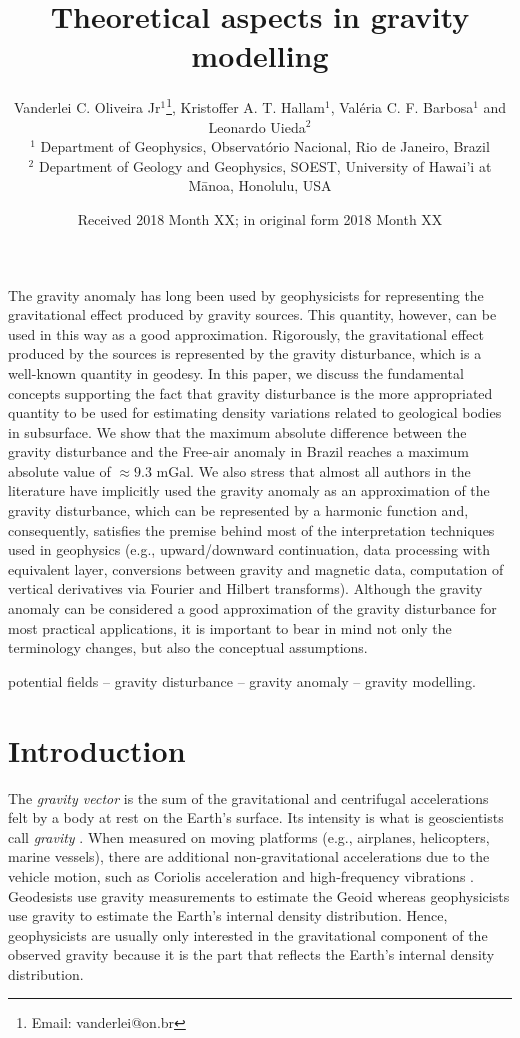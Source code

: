 \documentclass[extra]{gji}
\title[Theoretical aspects in gravity modelling]
      {Theoretical aspects in gravity modelling}
\author[Oliveira Jr et al.]
{Vanderlei C. Oliveira Jr$^1$\thanks{Email: vanderlei@on.br},
Kristoffer A. T. Hallam$^{1}$, Val\'{e}ria C. F. Barbosa$^1$
and Leonardo Uieda$^2$ \\
$^1$ Department of Geophysics, Observat\'{o}rio Nacional, Rio de Janeiro, Brazil \\
$^2$ Department of Geology and Geophysics, SOEST, University of Hawai'i at M\={a}noa, Honolulu, USA
}
\date{Received 2018 Month XX; in original form 2018 Month XX}
\begin{document}
\label{firstpage}

\maketitle


\begin{summary}
 The gravity anomaly has long been used by geophysicists for
 representing the gravitational effect produced by gravity
 sources. This quantity, however, can be used in this way as a good
 approximation. Rigorously, the gravitational effect produced by the sources
 is represented by the gravity disturbance, which is a well-known
 quantity in geodesy.
 In this paper, we discuss the fundamental concepts supporting
 the fact that gravity disturbance is the more appropriated quantity
 to be used for estimating density variations related to geological
 bodies in subsurface. We show that the maximum absolute difference
 between the gravity disturbance and the Free-air anomaly in Brazil
 reaches a maximum absolute value of $\approx 9.3$ mGal. We also stress
 that almost all authors in the literature have implicitly used the
 gravity anomaly as an approximation of the gravity disturbance,
 which can be represented by a harmonic function and, consequently,
 satisfies the premise behind most of
 the interpretation techniques used in geophysics (e.g.,
 upward/downward continuation, data processing with equivalent layer,
 conversions between gravity and magnetic data, computation of vertical
 derivatives via Fourier and Hilbert transforms).
 Although the gravity anomaly can be considered a good approximation of the
 gravity disturbance for most practical applications,
 it is important to bear in mind not only the terminology
 changes, but also the conceptual assumptions.

\end{summary}

\begin{keywords}
 potential fields -- gravity disturbance -- gravity anomaly -- gravity modelling.
\end{keywords}


\section{Introduction}

The \textit{gravity vector} is the sum of the gravitational and centrifugal
accelerations felt by a body at rest on the Earth's surface.
Its intensity is what is geoscientists call \textit{gravity}
\citep{heiskanen-moritz1967, hofmann-wellenhof-moritz2005}.
When measured on moving platforms (e.g., airplanes,
helicopters, marine vessels), there are additional
non-gravitational accelerations due to the vehicle motion,
such as Coriolis acceleration and high-frequency vibrations
\citep{glennie-etal2000,nabighian-etal2005-grav,baumann-etal2012}.
Geodesists use gravity measurements to estimate the Geoid \citep{li2001}
whereas geophysicists use gravity to estimate the Earth's
internal density distribution.
Hence, geophysicists are usually only interested
in the gravitational component of the observed gravity
because it is the part that reflects the Earth's internal density distribution.
\end{document}
